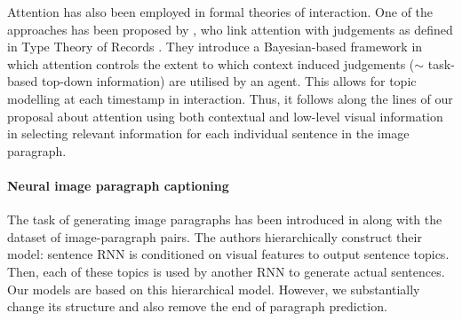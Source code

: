 \documentclass[11pt,a4paper]{article}
\begin{document}
Attention has also been employed in formal theories of interaction. One of the approaches has been proposed by , who link attention with
judgements as defined in Type Theory of Records \cite{Cooper08typetheory}.
They introduce a Bayesian-based framework in which attention controls the extent to which context induced judgements ($\sim$ task-based top-down information) are utilised by an agent. This allows for topic modelling at each timestamp in interaction. Thus, it follows along the lines of our proposal about attention using both contextual and low-level visual information in selecting relevant information for each individual sentence in the image paragraph.

\fi



\paragraph{Neural image paragraph captioning}
The task of generating image paragraphs has been introduced in \cite{krause2016hierarchical} along with the dataset of image-paragraph pairs.
The authors hierarchically construct their model: sentence RNN is conditioned on visual features to output sentence topics.
Then, each of these topics is used by another RNN to generate actual sentences.
Our models are based on this hierarchical model.
However, we substantially change its structure and also remove the end of paragraph prediction.

\end{document}
